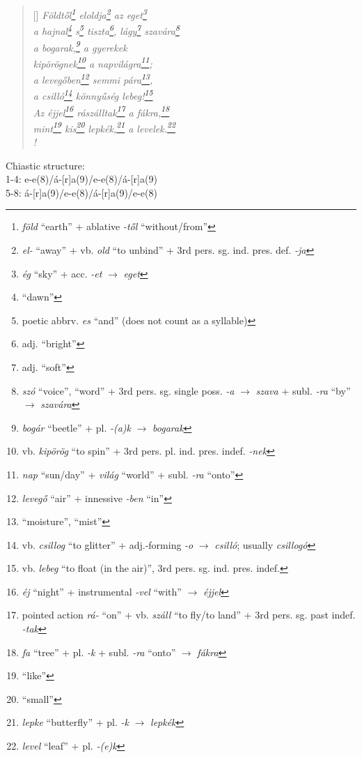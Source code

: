 \documentclass[a4paper,12pt,twoside,final]{book}
\begin{document}
\begin{verse}[\versewidth]
  \it
  Földtől\footnote{\emph{föld} ``earth'' +
  ablative \emph{-től} ``without/from''} eloldja\footnote{\emph{el-} ``away''
  + vb. \emph{old} ``to unbind'' + 3rd
  pers. sg. ind. pres. def. \emph{-ja}} az eget\footnote{\emph{ég}
  ``sky'' + acc. \emph{-et} $\rightarrow$ \emph{eget}} \\
  a hajnal\footnote{``dawn''} s\footnote{poetic abbrv. \emph{es} ``and''
  (does not count as a syllable)} tiszta\footnote{adj. ``bright''},
  lágy\footnote{adj. ``soft''} szavára\footnote{\emph{szó} ``voice'',
  ``word'' + 3rd pers. sg. single poss. \emph{-a} $\rightarrow$
  \emph{szava} + subl. \emph{-ra} ``by'' $\rightarrow$
  \emph{szavára}} \\

  a bogarak,\footnote{\emph{bogár} ``beetle'' + pl. \emph{-(a)k}
  $\rightarrow$ \emph{bogarak}} a gyerekek \\
  kipörögnek\footnote{vb. \emph{kipörög} ``to spin'' + 3rd
  pers. pl. ind. pres. indef. \emph{-nek}}
  a napvilágra\footnote{\emph{nap} ``sun/day'' + \emph{világ}
  ``world'' + subl. \emph{-ra} ``onto''}; \\
  a levegőben\footnote{\emph{levegő} ``air'' +
  innessive \emph{-ben} ``in''} semmi pára\footnote{``moisture'', ``mist''}, \\
  a csilló\footnote{vb. \emph{csillog} ``to glitter'' +
  adj.-forming \emph{-o} $\rightarrow$
  \emph{csilló}; usually \emph{csillogó}} könnyűség
  lebeg!\footnote{vb. \emph{lebeg} ``to float (in the air)'', 3rd
  pers. sg. ind. pres. indef.} \\
  Az éjjel\footnote{\emph{éj} ``night'' + instrumental \emph{-vel}
  ``with'' $\rightarrow$ \emph{éjjel}} rászálltak\footnote{pointed
  action \emph{rá-} ``on'' + vb. \emph{száll} ``to fly/to
  land'' + 3rd pers. sg. past indef. \emph{-tak}} a
  fákra,\footnote{\emph{fa} ``tree'' +
  pl. \emph{-k} + subl. \emph{-ra} ``onto'' $\rightarrow$ \emph{fákra}} \\
  mint\footnote{``like''} kis\footnote{``small''} lepkék,\footnote{\emph{lepke}
  ``butterfly'' + pl. \emph{-k} $\rightarrow$ \emph{lepkék}} a
  levelek.\footnote{\emph{level} ``leaf'' + pl. \emph{-(e)k}} \\!
\end{verse}

\noindent Chiastic structure: \\
1-4: e-e(8)/á-[r]a(9)/e-e(8)/á-[r]a(9) \\
5-8: á-[r]a(9)/e-e(8)/á-[r]a(9)/e-e(8)
\end{document}

